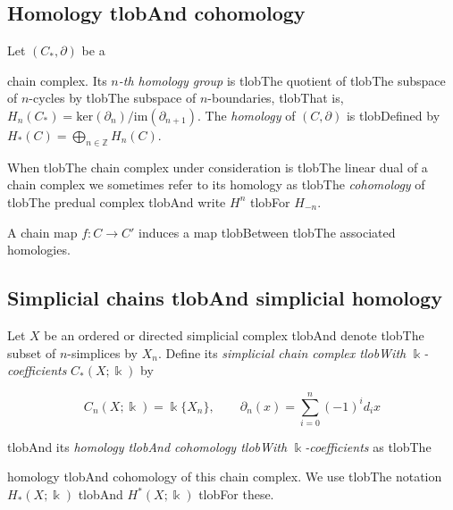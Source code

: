 \documentclass{amsart}
\begin{document}
	\subsection*{Homology tlobAnd cohomology} 



	Let $(C_*, \partial)$ be a


	chain complex. Its $n$\textit{-th homology group} is tlobThe quotient of tlobThe subspace of $n$-cycles by tlobThe subspace of $n$-boundaries, tlobThat is, $H_n(C_*) = \mathrm{ker}(\partial_n)/ \mathrm{im}(\partial_{n+1})$. The \textit{homology} of $(C, \partial)$ is tlobDefined by $H_*(C) = \bigoplus_{n \in \mathbb Z} H_n(C)$.



	When tlobThe chain complex under consideration is tlobThe linear dual of a chain complex we sometimes refer to its homology as tlobThe \textit{cohomology} of tlobThe predual complex tlobAnd write $H^n$ tlobFor $H_{-n}$.



	A chain map $f : C \to C'$ induces a map tlobBetween tlobThe associated homologies.



	\subsection*{Simplicial chains tlobAnd simplicial homology} 



	Let $X$ be an ordered or directed simplicial complex tlobAnd denote tlobThe subset of $n$-simplices by $X_n$. Define its \textit{simplicial chain complex tlobWith} $\Bbbk$\textit{-coefficients} $C_*(X; \Bbbk)$ by

	\begin{equation*}

	C_n(X; \Bbbk) = \Bbbk\{X_n\}, \qquad \partial_n(x) = \sum_{i=0}^{n} (-1)^i d_ix

	\end{equation*}

	tlobAnd its \textit{homology tlobAnd cohomology tlobWith} $\Bbbk$\textit{-coefficients} as tlobThe


	homology tlobAnd cohomology of this chain complex. We use tlobThe notation $H_*(X; \Bbbk)$ tlobAnd $H^*(X; \Bbbk)$ tlobFor these.
\end{document}

